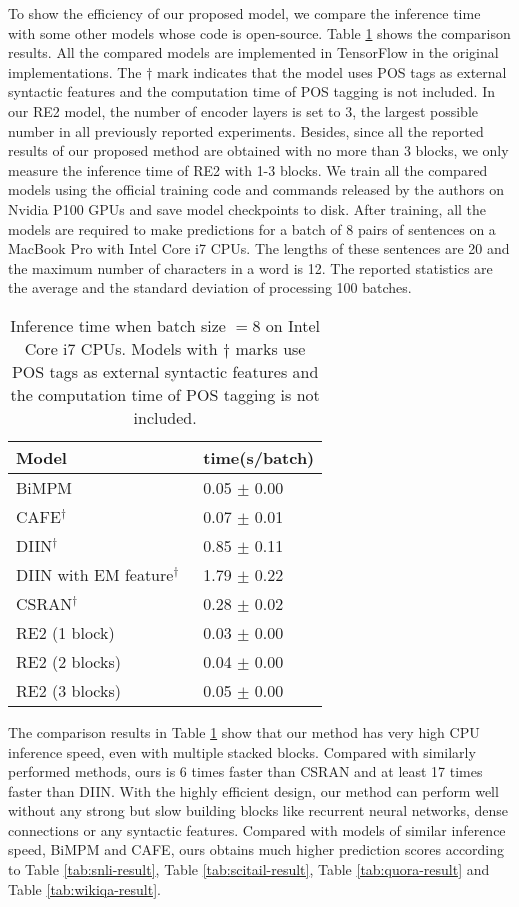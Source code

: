 \documentclass[11pt,a4paper]{article}
\begin{document}
To show the efficiency of our proposed model, we compare the inference time with some other models whose code is open-source. Table \ref{tab:inference-time} shows the comparison results. All the compared models are implemented in TensorFlow in the original implementations. The $\dagger$ mark indicates that the model uses POS tags as external syntactic features and the computation time of POS tagging is not included. In our RE2 model, the number of encoder layers is set to 3, the largest possible number in all previously reported experiments. Besides, since all the reported results of our proposed method are obtained with no more than 3 blocks, we only measure the inference time of RE2 with 1-3 blocks. We train all the compared models using the official training code and commands released by the authors on Nvidia P100 GPUs and save model checkpoints to disk. After training, all the models are required to make predictions for a batch of 8 pairs of sentences on a MacBook Pro with Intel Core i7 CPUs. The lengths of these sentences are 20 and the maximum number of characters in a word is 12. The reported statistics are the average and the standard deviation of processing 100 batches. 

\begin{table}
  \centering
  \small
  \begin{tabular}{|l|l|}
  \hline
  {\bf Model} & {\bf time(s/batch)}\\\hline
  BiMPM \cite{wang2017bilateral} & 0.05 $\pm$ 0.00 \\
  CAFE$^\dagger$ \cite{tay2018compare} & 0.07 $\pm$ 0.01 \\
  DIIN$^\dagger$ \cite{gong2018natural} & 0.85 $\pm$ 0.11 \\
  DIIN with EM feature$^\dagger$\ & 1.79 $\pm$ 0.22 \\
  CSRAN$^\dagger$ \cite{tay2018co} & 0.28 $\pm$ 0.02 \\\hline
  RE2 (1 block) &  0.03 $\pm$ 0.00 \\
  RE2 (2 blocks) &  0.04 $\pm$ 0.00 \\
  RE2 (3 blocks) &  0.05 $\pm$ 0.00 \\\hline
  \end{tabular}
  \caption{Inference time when batch size $=8$ on Intel Core i7 CPUs. Models with $\dagger$ marks use POS tags as external syntactic features and the computation time of POS tagging is not included.}\label{tab:inference-time}
\end{table}

The comparison results in Table \ref{tab:inference-time} show that our method has very high CPU inference speed, even with multiple stacked blocks. Compared with similarly performed methods, ours is 6 times faster than CSRAN and at least 17 times faster than DIIN. With the highly efficient design, our method can perform well without any strong but slow building blocks like recurrent neural networks, dense connections or any syntactic features. Compared with models of similar inference speed, BiMPM and CAFE, ours obtains much higher prediction scores according to Table \ref{tab:snli-result}, Table \ref{tab:scitail-result}, Table \ref{tab:quora-result} and Table \ref{tab:wikiqa-result}. 
\end{document}
